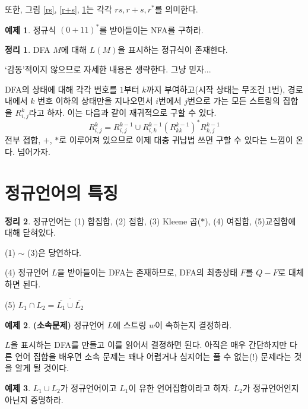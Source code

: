 \documentclass[b5paper]{book}
\theoremstyle{definition}
\newtheorem{thm}{정리}[chapter]
\newtheorem{ex}{예제}[chapter]
\newenvironment{pf*}{\pushQED{\qed}\pf}{\popQED\endpf}
\begin{document}
\begin{figure}[!ht]
    \centering
    \caption{} 
    \label{r*}
\end{figure}
또한, 그림 \ref{rs}, \ref{r+s}, \ref{r*}는 각각 $rs, r+s, r^*$를 의미한다. 
\begin{ex}
     정규식 $(0+11)^*$를 받아들이는 NFA를 구하라. 
\end{ex}
\begin{thm}
    DFA $M$에 대해 $L(M)$을 표시하는 정규식이 존재한다.
\end{thm}
\begin{pf*}
    `감동'적이지 않으므로 자세한 내용은 생략한다. 그냥 믿자...

DFA의 상태에 대해 각각 번호를 $1$부터 $k$까지 부여하고(시작 상태는 무조건 1번), 경로 내에서
$k$ 번호 이하의 상태만을 지나오면서 $i$번에서 $j$번으로 
가는 모든 스트링의 집합을 $R^{k}_{i,j}$라고 하자.
이는 다음과 같이 재귀적으로 구할 수 있다.
$$R^{k}_{i,j} = R^{k-1}_{i,j} \cup R^{k-1}_{i,k}\left(R^{k-1}_{kk}\right)^{*} R^{k-1}_{k,j}$$
전부 접합, $+$, $*$로 이루어져 있으므로 이제 대충 귀납법 쓰면 구할 수 있다는 느낌이 온다. 넘어가자.
\end{pf*}
\section{정규언어의 특징}
\begin{thm}
    정규언어는 (1) 합집합, (2) 접합, (3) Kleene 곱($*$), (4) 여집합, (5)교집합에
대해 닫혀있다.
\end{thm}
\begin{pf*}
    (1) $\sim$ (3)은 당연하다.

(4) 정규언어 $L$을 받아들이는 DFA는 존재하므로, DFA의 최종상태 $F$를
$Q-F$로 대체하면 된다.

(5) $L_1 \cap L_2  = \overline{\overline{L_1} \cup \overline{L_2}}$
\end{pf*} 
\begin{ex}
    \textbf{(소속문제)} 정규언어 $L$에 스트링 $w$이 속하는지 결정하라. 

$L$을 표시하는 DFA를 만들고 이를 읽어서 결정하면 된다. 아직은 매우 간단하지만 
다른 언어 집합을 배우면 소속 문제는 꽤나 어렵거나 심지어는 풀 수 없는(!) 
문제라는 것을 알게 될 것이다. 
\end{ex} 
\begin{ex}
    $L_1 \cup L_2$가 정규언어이고 $L_1$이 유한 언어집합이라고 하자. $L_2$가
    정규언어인지 아닌지 증명하라. 
\end{ex}
\end{document}
